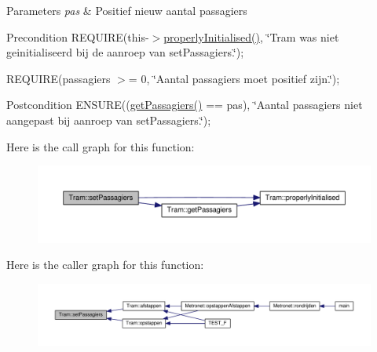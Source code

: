 \begin{DoxyParams}{Parameters}
{\em pas} & Positief nieuw aantal passagiers \\
\hline
\end{DoxyParams}
\begin{DoxyPrecond}{Precondition}
R\+E\+Q\+U\+I\+RE(this-\/$>$\hyperlink{class_tram_a98992eff0453f54fbe64e1f1064169c7}{properly\+Initialised()}, \char`\"{}\+Tram was niet geinitialiseerd bij de aanroep van set\+Passagiers.\char`\"{}); 

R\+E\+Q\+U\+I\+RE(passagiers $>$= 0, \char`\"{}\+Aantal passagiers moet positief zijn.\char`\"{}); 
\end{DoxyPrecond}
\begin{DoxyPostcond}{Postcondition}
E\+N\+S\+U\+RE((\hyperlink{class_tram_a8e9e449f0032f0f439c196e0980a891e}{get\+Passagiers()} == pas), \char`\"{}\+Aantal passagiers niet aangepast bij aanroep van set\+Passagiers.\char`\"{}); 
\end{DoxyPostcond}


Here is the call graph for this function\+:
\nopagebreak
\begin{figure}[H]
\begin{center}
\leavevmode
\includegraphics[width=350pt]{class_tram_a3454b4b012930b02eff8fd22b7d9428a_cgraph}
\end{center}
\end{figure}




Here is the caller graph for this function\+:
\nopagebreak
\begin{figure}[H]
\begin{center}
\leavevmode
\includegraphics[width=350pt]{class_tram_a3454b4b012930b02eff8fd22b7d9428a_icgraph}
\end{center}
\end{figure}


